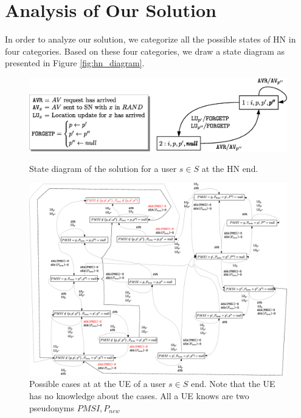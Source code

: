 \documentclass{llncs} %
\begin{document}
\section{Analysis of Our Solution}
In order to analyze our solution, we categorize all the possible states of HN in four categories. Based on these four categories, we draw a state diagram as presented in Figure \ref{fig:hn_diagram}. 

\begin{figure}[!tbp]
  \centering
    \begin{minipage}[b]{\textwidth}
    \includegraphics[width=\textwidth]{HN_diagram.eps}
 \caption{State diagram of the solution for a user $s \in S$ at the HN end.}
  \label{fig:hn_diagram}
  \end{minipage}
    \hfill
  \vspace{.5cm}
  \begin{minipage}[b]{\textwidth}
    \includegraphics[width=\textwidth]{UE_diagram.eps}
 \caption{Possible cases at at the UE of a user $s \in S$ end. Note that the UE has no knowledge about the cases. All a UE knows are two pseudonyms $PMSI,P_{new}$}
  \label{fig:ue_diagram}
  \end{minipage}
\end{figure}
\end{document}
